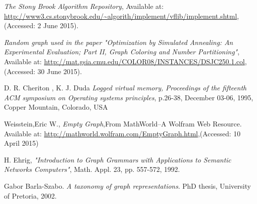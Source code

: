 \begin{thebibliography}{19}
	\emph{The Stony Brook Algorithm Repository},
	Available at: \url{http://www3.cs.stonybrook.edu/~algorith/implement/vflib/implement.shtml},
	(Accessed: 2 June 2015).	
		
	\emph{Random graph used in the paper
              "Optimization by Simulated Annealing: An
               Experimental Evaluation; Part II, Graph
               Coloring and Number Partitioning"},
	Available at: \url{http://mat.gsia.cmu.edu/COLOR08/INSTANCES/DSJC250.1.col},
	(Accessed: 30 June 2015).
	
	D. R. Cheriton , K. J. Duda
	\emph{Logged virtual memory, Proceedings of the fifteenth ACM symposium on Operating systems principles},
	 p.26-38, December 03-06, 1995, Copper Mountain, Colorado, USA 
	 
	Weisstein,Eric W.,
	\emph{Empty Graph},From MathWorld–A Wolfram Web Resource.
	Available at: \url{http://mathworld.wolfram.com/EmptyGraph.html},(Accessed: 10 April 2015)
	
	H. Ehrig, 
	\emph{"Introduction to Graph Grammars with Applications to Semantic Networks Computers"},
	Math. Appl. 23, pp. 557-572, 1992.
	
	Gabor Barla-Szabo. \emph{A taxonomy of graph representations}. PhD thesis,
	University of Pretoria, 2002.
\end{thebibliography}